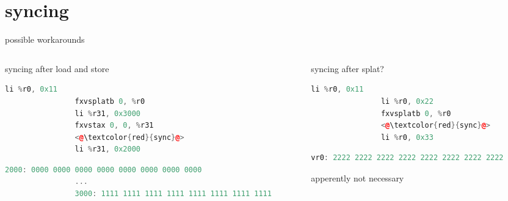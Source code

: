 \documentclass[10pt]{beamer}
\begin{document}
\section{syncing}
\begin{frame}[fragile]{possible workarounds}{}
	\begin{columns}[t]
		\begin{column}{0.4\textwidth}
			\begin{block}{syncing after load and store}
			\begin{lstlisting}[language=C++,basicstyle=\ttfamily\scriptsize,keywordstyle=\color{red}]
				li %r0, 0x11
				fxvsplatb 0, %r0
				li %r31, 0x3000
				fxvstax 0, 0, %r31
				<@\textcolor{red}{sync}@>
				li %r31, 0x2000
			\end{lstlisting}
      			\begin{lstlisting}[language=C++,basicstyle=\fontsize{5}{7}\selectfont\ttfamily,keywordstyle=\color{red}]
				2000: 0000 0000 0000 0000 0000 0000 0000 0000
				...
				3000: 1111 1111 1111 1111 1111 1111 1111 1111
			\end{lstlisting}
		\end{block}
    	\end{column}
    	\begin{column}{0.4\textwidth}
    		\begin{block}{syncing after splat?}
    		\begin{lstlisting}[language=C++,basicstyle=\ttfamily\scriptsize,keywordstyle=\color{red}]
				li %r0, 0x11
				li %r0, 0x22
				fxvsplatb 0, %r0
				<@\textcolor{red}{sync}@>
				li %r0, 0x33
			\end{lstlisting}
      		\begin{lstlisting}[language=C++,basicstyle=\fontsize{5}{7}\selectfont\ttfamily,keywordstyle=\color{red}]
				vr0: 2222 2222 2222 2222 2222 2222 2222 2222
			\end{lstlisting}
			\end{block}
		apperently not necessary
    	\end{column}
	\end{columns}
\end{frame}
\end{document}
